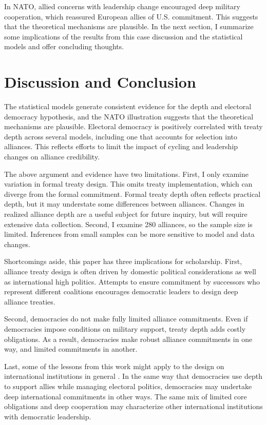 \documentclass[12pt]{article}
\begin{document}
In NATO, allied concerns with leadership change encouraged deep military cooperation, which reassured European allies of U.S. commitment. 
This suggests that the theoretical mechanisms are plausible. 
In the next section, I summarize some implications of the results from this case discussion and the statistical models and offer concluding thoughts. 



\section{Discussion and Conclusion} 


The statistical models generate consistent evidence for the depth and electoral democracy hypothesis, and the NATO illustration suggests that the theoretical mechanisms are plausible. 
Electoral democracy is positively correlated with treaty depth across several models, including one that accounts for selection into alliances. 
This reflects efforts to limit the impact of cycling and leadership changes on alliance credibility. 


The above argument and evidence have two limitations.
First, I only examine variation in formal treaty design. 
This omits treaty implementation, which can diverge from the formal commitment.   
Formal treaty depth often reflects practical depth, but it may understate some differences between alliances. 
Changes in realized alliance depth are a useful subject for future inquiry, but will require extensive data collection.
Second, I examine 280 alliances, so the sample size is limited. 
Inferences from small samples can be more sensitive to model and data changes. 


Shortcomings aside, this paper has three implications for scholarship. 
First, alliance treaty design is often driven by domestic political considerations as well as international high politics. 
Attempts to ensure commitment by successors who represent different coalitions encourages democratic leaders to design deep alliance treaties. 

Second, democracies do not make fully limited alliance commitments.
Even if democracies impose conditions on military support, treaty depth adds costly obligations.
As a result, democracies make robust alliance commitments in one way, and limited commitments in another. 


Last, some of the lessons from this work might apply to the design on international institutions in general \citep{DownesRocke1995, MartinSimmons1998, Koremenosetal2001, Thompson2010}.
In the same way that democracies use depth to support allies while managing electoral politics, democracies may undertake deep international commitments in other ways. 
The same mix of limited core obligations and deep cooperation may characterize other international institutions with democratic leadership. 
\end{document}
